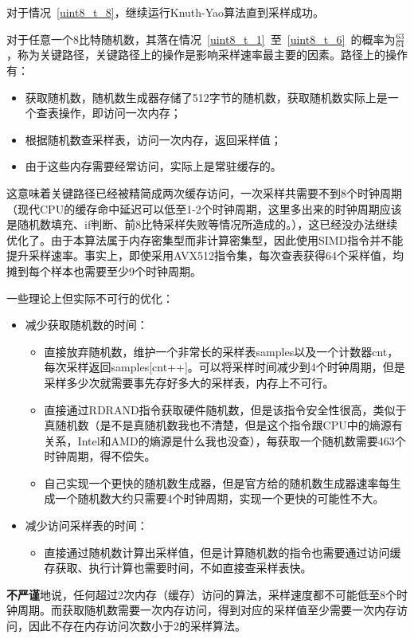 \documentclass{article}
\begin{document}
    对于情况~\ref{uint8_t_8}，继续运行Knuth-Yao算法直到采样成功。
    
    对于任意一个8比特随机数，其落在情况~\ref{uint8_t_1}~至~\ref{uint8_t_6}~的概率为$\frac{63}{64}$，称为关键路径，关键路径上的操作是影响采样速率最主要的因素。路径上的操作有：
    \begin{itemize}
        \item 获取随机数，随机数生成器存储了512字节的随机数，获取随机数实际上是一个查表操作，即访问一次内存；
        \item 根据随机数查采样表，访问一次内存，返回采样值；
        \item 由于这些内存需要经常访问，实际上是常驻缓存的。
    \end{itemize}
    这意味着关键路径已经被精简成两次缓存访问，一次采样共需要不到8个时钟周期（现代CPU的缓存命中延迟可以低至1-2个时钟周期，这里多出来的时钟周期应该是随机数填充、if判断、前8比特采样失败等情况所造成的。），这已经没办法继续优化了。由于本算法属于内存密集型而非计算密集型，因此使用SIMD指令并不能提升采样速率。事实上，即使采用AVX512指令集，每次查表获得64个采样值，均摊到每个样本也需要至少9个时钟周期。
    
    一些理论上但实际不可行的优化：
    \begin{itemize}
        \item 减少获取随机数的时间：
        \begin{itemize}
            \item 直接放弃随机数，维护一个非常长的采样表samples以及一个计数器cnt，每次采样返回samples[cnt++]。可以将采样时间减少到4个时钟周期，但是采样多少次就需要事先存好多大的采样表，内存上不可行。
            \item 直接通过RDRAND指令获取硬件随机数，但是该指令安全性很高，类似于真随机数（是不是真随机数我也不清楚，但是这个指令跟CPU中的熵源有关系，Intel和AMD的熵源是什么我也没查），每获取一个随机数需要463个时钟周期，得不偿失。
            \item 自己实现一个更快的随机数生成器，但是官方给的随机数生成器速率每生成一个随机数大约只需要4个时钟周期，实现一个更快的可能性不大。
        \end{itemize}
        \item 减少访问采样表的时间：
        \begin{itemize}
            \item 直接通过随机数计算出采样值，但是计算随机数的指令也需要通过访问缓存获取、执行计算也需要时间，不如直接查采样表快。
        \end{itemize}
    \end{itemize}
    \textbf{不严谨}地说，任何超过2次内存（缓存）访问的算法，采样速度都不可能低至8个时钟周期。而获取随机数需要一次内存访问，得到对应的采样值至少需要一次内存访问，因此不存在内存访问次数小于2的采样算法。
    
\end{document}
